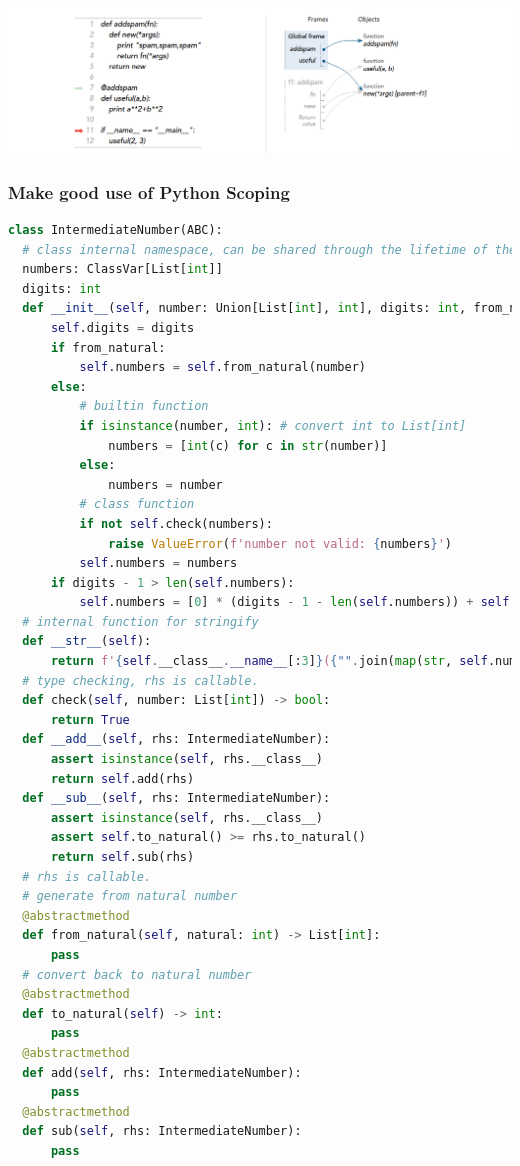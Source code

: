 \documentclass[a4paper]{exam}
\theoremstyle{definition}
\begin{document}
\includegraphics[width=15cm]{./img/b5674ca16f72af11d7a1c70602fbfe10_b.png}



\subsubsection{Make good use of Python Scoping}
\begin{lstlisting}[language=Python]
class IntermediateNumber(ABC):
  # class internal namespace, can be shared through the lifetime of the class
  numbers: ClassVar[List[int]]
  digits: int
  def __init__(self, number: Union[List[int], int], digits: int, from_natural: bool):
      self.digits = digits
      if from_natural:
          self.numbers = self.from_natural(number)
      else:
          # builtin function
          if isinstance(number, int): # convert int to List[int]
              numbers = [int(c) for c in str(number)]
          else:
              numbers = number
          # class function
          if not self.check(numbers):
              raise ValueError(f'number not valid: {numbers}')
          self.numbers = numbers
      if digits - 1 > len(self.numbers):
          self.numbers = [0] * (digits - 1 - len(self.numbers)) + self.numbers
  # internal function for stringify
  def __str__(self):
      return f'{self.__class__.__name__[:3]}({"".join(map(str, self.numbers))}){self.custom_str()}'
  # type checking, rhs is callable.
  def check(self, number: List[int]) -> bool:
      return True
  def __add__(self, rhs: IntermediateNumber):
      assert isinstance(self, rhs.__class__)
      return self.add(rhs)
  def __sub__(self, rhs: IntermediateNumber):
      assert isinstance(self, rhs.__class__)
      assert self.to_natural() >= rhs.to_natural()
      return self.sub(rhs)
  # rhs is callable.
  # generate from natural number
  @abstractmethod
  def from_natural(self, natural: int) -> List[int]:
      pass
  # convert back to natural number
  @abstractmethod
  def to_natural(self) -> int:
      pass
  @abstractmethod
  def add(self, rhs: IntermediateNumber):
      pass
  @abstractmethod
  def sub(self, rhs: IntermediateNumber):
      pass
\end{lstlisting}
\end{document}
